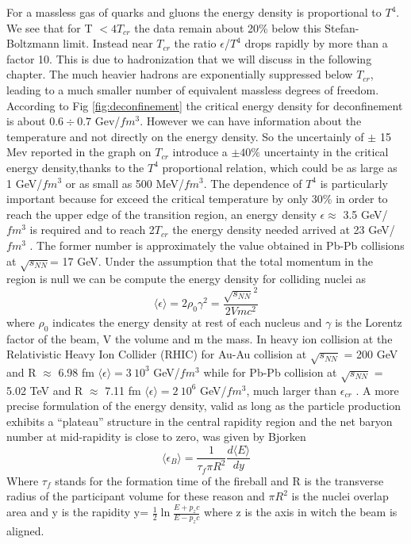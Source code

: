 \documentclass[12pt,a4paper]{book}
\begin{document}
	For a massless gas of quarks and gluons the energy density is proportional to $T^4$.  We see that for T $ <4T_{cr}$ the data remain about 20\% below this Stefan-Boltzmann limit. Instead near $T_{cr}$ the ratio $\epsilon$/$T^4$ drops rapidly by more than a factor 10. This is due to hadronization that we will discuss in the following chapter. The much heavier hadrons are exponentially suppressed below $T_{cr}$, leading to a much smaller number of equivalent massless degrees of freedom. According to Fig \ref{fig:deconfinement} the critical energy density for deconfinement is about $0.6 \div 0.7$ Gev/$fm^3$. However we can have information about the temperature and not directly on the energy density. So the uncertainly of $\pm$ 15 Mev reported in the graph on $T_{cr}$ introduce a $\pm 40 \%$ uncertainty in the critical energy density,thanks to the $T^4$ proportional relation, which could be as large as 1 GeV/$fm^3$ or as small as 500 MeV/$fm^3$. The dependence of $T^4$ is particularly important because for exceed the critical temperature by only 30\% in order to reach the upper edge of the transition region, an energy density $\epsilon \approx$  3.5 GeV/$fm^3$ is required and to reach 2$T_{cr}$ the energy density needed arrived at 23 GeV/$fm^3$ \cite{heinz2004conceptsheavyionphysics}. The former number is approximately the value obtained in Pb-Pb collisions at $\sqrt{s_{NN}}$= 17 GeV. Under the assumption that the total momentum in the region is null we can be compute the energy density for colliding nuclei as
	\begin{equation}
		\langle \epsilon \rangle = 2 \rho_0 \gamma^2 = \frac{\sqrt{s_{NN}}^2}{2 V mc^2}
	\end{equation} 
	where $\rho_0$  indicates the energy density at rest of each nucleus and $\gamma$ is the Lorentz factor of the beam, V the volume and m the mass. In heavy ion collision at the Relativistic Heavy Ion Collider (RHIC) for Au-Au collision at $\sqrt{s_{NN}}$ = 200 GeV and R $\approx$ 6.98 fm $\langle \epsilon \rangle = 3 \  10^3$ GeV/$fm^3$ while for Pb-Pb collision at $\sqrt{s_{NN}}$ = 5.02 TeV and R $\approx$ 7.11 fm $\langle \epsilon \rangle = 2 \  10^6$ GeV/$fm^3$, much larger than $\epsilon_{cr}$ . A more precise formulation of the energy density, valid as long as the particle production exhibits a “plateau” structure in the central rapidity region and the net baryon number at mid-rapidity is close to zero, was given by Bjorken \cite{PhysRevD.27.140}
	\begin{equation}
		\langle \epsilon_B \rangle = \frac{1}{\tau_f \pi R^2} \frac{d \langle E \rangle}{dy}
	\end{equation}
	Where $\tau_f$ stands for the formation time of the fireball and R is the transverse radius of the participant volume for these reason and $\pi R^2$ is the nuclei overlap area and y is the rapidity y= $\frac{1}{2} \ln \frac{E+ p_z c} {E - p_z c}$ where z is the axis in witch the beam is aligned. \cite{amsdottorato9036}
	
\end{document}
